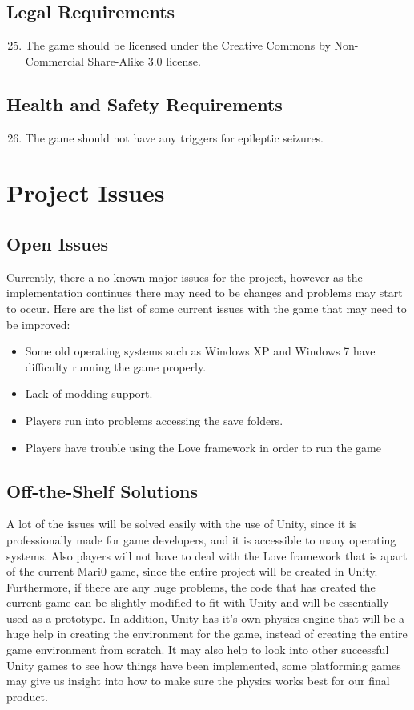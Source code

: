 \documentclass[12pt, titlepage]{article}
\begin{document}
\subsection{Legal Requirements}
\begin{enumerate}
\setcounter{enumi}{24}
	\item The game should be licensed under the Creative Commons by Non-Commercial Share-Alike 3.0 license. 
\end{enumerate}

\subsection{Health and Safety Requirements}
\begin{enumerate}
\setcounter{enumi}{25}
	\item The game should not have any triggers for epileptic seizures.
\end{enumerate}

\section{Project Issues}

\subsection{Open Issues}
Currently, there a no known major issues for the project, however as the implementation continues there may need to be changes and problems may start to occur. 
Here are the list of some current issues with the game that may need to be improved:
\begin{itemize}
\item Some old operating systems such as Windows XP and Windows 7 have difficulty running the game properly.
\item Lack of modding support.
\item Players run into problems accessing the save folders.
\item Players have trouble using the Love framework in order to run the game
\end{itemize}

\subsection{Off-the-Shelf Solutions}
A lot of the issues will be solved easily with the use of Unity, since it is professionally made for game developers, and it is accessible to many operating systems. Also players will not have to deal with the Love framework that is apart of the current Mari0 game, since the entire project will be created in Unity.
Furthermore, if there are any huge problems, the code that has created the current game can be slightly modified to fit with Unity and will be essentially used as a prototype. In addition, Unity has it's own physics engine that will be a huge help in creating the environment for the game, instead of creating the entire game environment from scratch.
It may also help to look into other successful Unity games to see how things have been implemented, some platforming games may give us insight into how to make sure the physics works best for our final product. 
\end{document}
